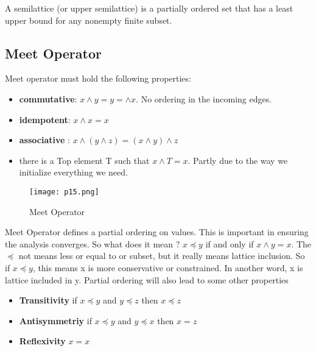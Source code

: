 A semilattice (or upper semilattice) is a partially ordered set that has a least upper bound for any 
nonempty finite subset.





\subsection{ Meet Operator }

Meet operator must hold the following properties:

\begin{itemize}
\item \textbf{commutative}: \(x \wedge y = y = \wedge x\). No ordering in the incoming edges.

\item \textbf{idempotent}: \(x \wedge x =  x\)

\item \textbf{associative }: \(x \wedge( y\wedge z) =  (x \wedge y) \wedge z\)

\item there is a Top element T such that \(x \wedge T = x\). Partly due to the way 
we initialize everything we need.
\end{itemize}

\begin{figure}[h]
    \centering
    \texttt{[image: p15.png]}
    \caption{Meet Operator}
    \label{fig:p15}
\end{figure}



Meet Operator defines a partial ordering on values. This is important in ensuring the analysis converges. So 
what does it mean ? \(x \preceq y\) if and only if \(x \wedge y = x\). The \(\preceq \) not means less or equal to or subset, but it really means lattice inclusion.
So if \(x \preceq y\), this means x is more conservative or constrained. In another word, x is lattice included in y.
Partial  ordering will also lead to some other properties
    \begin{itemize}
        \item \textbf{Transitivity} if \(x \preceq y\) and  \(y \preceq z\) then  \(x \preceq z\)
        \item \textbf{Antisymmetriy} if \(x \preceq y\) and  \(y \preceq x\) then  \(x = z\)
        \item \textbf{Reflexivity}  \(x = x\)
\end{itemize}


